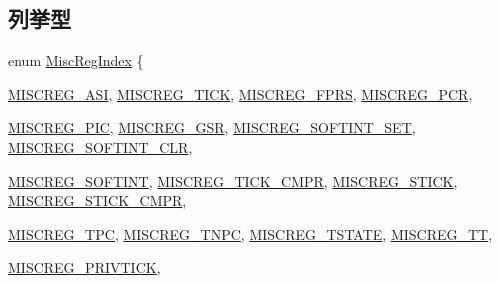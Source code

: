\subsection*{列挙型}
\begin{DoxyCompactItemize}
\item 
enum \hyperlink{namespaceSparcISA_a1e522017e015d4c7efd6b2360143aa67}{MiscRegIndex} \{ \par
\hyperlink{namespaceSparcISA_a1e522017e015d4c7efd6b2360143aa67a5b31a66cbee13241f5c1ccf56f80653d}{MISCREG\_\-ASI}, 
\hyperlink{namespaceSparcISA_a1e522017e015d4c7efd6b2360143aa67a3aec7a111c8a1c741ec91d6e530b263d}{MISCREG\_\-TICK}, 
\hyperlink{namespaceSparcISA_a1e522017e015d4c7efd6b2360143aa67a1b7a86976218e908c55fc8c3e5c6e717}{MISCREG\_\-FPRS}, 
\hyperlink{namespaceSparcISA_a1e522017e015d4c7efd6b2360143aa67a831bcb4e8ff69844e21bd839cf214608}{MISCREG\_\-PCR}, 
\par
\hyperlink{namespaceSparcISA_a1e522017e015d4c7efd6b2360143aa67a3ef2baf5d1045c10bbfde7c0101795ab}{MISCREG\_\-PIC}, 
\hyperlink{namespaceSparcISA_a1e522017e015d4c7efd6b2360143aa67a74228d6b7d68e171082cbbbd2d2e22fb}{MISCREG\_\-GSR}, 
\hyperlink{namespaceSparcISA_a1e522017e015d4c7efd6b2360143aa67a9cc1cda8c8ebee4a7454bd804d09e05e}{MISCREG\_\-SOFTINT\_\-SET}, 
\hyperlink{namespaceSparcISA_a1e522017e015d4c7efd6b2360143aa67a23096b8a95cffeacb58f6655f565b164}{MISCREG\_\-SOFTINT\_\-CLR}, 
\par
\hyperlink{namespaceSparcISA_a1e522017e015d4c7efd6b2360143aa67ace0f2822668abb5294073835b220624c}{MISCREG\_\-SOFTINT}, 
\hyperlink{namespaceSparcISA_a1e522017e015d4c7efd6b2360143aa67a2ab6b22ba7108e6a0b611ecac6ef3d82}{MISCREG\_\-TICK\_\-CMPR}, 
\hyperlink{namespaceSparcISA_a1e522017e015d4c7efd6b2360143aa67a77622a4863a3abb5c1df9679bd7ad518}{MISCREG\_\-STICK}, 
\hyperlink{namespaceSparcISA_a1e522017e015d4c7efd6b2360143aa67aca6e6be17177338c0c326b829c063d53}{MISCREG\_\-STICK\_\-CMPR}, 
\par
\hyperlink{namespaceSparcISA_a1e522017e015d4c7efd6b2360143aa67aac88b4ac903ab443bffc7a0e2fd44fb7}{MISCREG\_\-TPC}, 
\hyperlink{namespaceSparcISA_a1e522017e015d4c7efd6b2360143aa67a7cd193aa6dd0a0d26ed3568755bf4dc5}{MISCREG\_\-TNPC}, 
\hyperlink{namespaceSparcISA_a1e522017e015d4c7efd6b2360143aa67a465e91169648b0b2b03f0eaab4d8b44f}{MISCREG\_\-TSTATE}, 
\hyperlink{namespaceSparcISA_a1e522017e015d4c7efd6b2360143aa67a85cab97106fabe35a326cad6a3c10443}{MISCREG\_\-TT}, 
\par
\hyperlink{namespaceSparcISA_a1e522017e015d4c7efd6b2360143aa67a46e7f62e3c90bf53e58e461a9e92e43d}{MISCREG\_\-PRIVTICK}, 

\end{DoxyCompactItemize}
